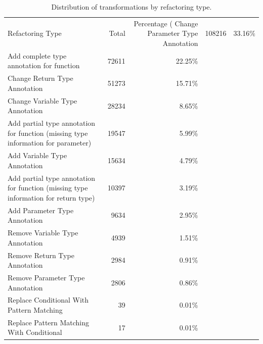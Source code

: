 \begin{table}
\caption{Distribution of transformations by refactoring type.}
\label{tab:refactoring-type-distribution}
\begin{tabular}{lrr}
\toprule
Refactoring Type & Total & Percentage (%
\midrule
Change Parameter Type Annotation & \num{108216} & 33.16\% \\
Add complete type annotation for function & \num{72611} & 22.25\% \\
Change Return Type Annotation & \num{51273} & 15.71\% \\
Change Variable Type Annotation & \num{28234} & 8.65\% \\
Add partial type annotation for function (missing type information for parameter) & \num{19547} & 5.99\% \\
Add Variable Type Annotation & \num{15634} & 4.79\% \\
Add partial type annotation for function (missing type information for return type) & \num{10397} & 3.19\% \\
Add Parameter Type Annotation & \num{9634} & 2.95\% \\
Remove Variable Type Annotation & \num{4939} & 1.51\% \\
Remove Return Type Annotation & \num{2984} & 0.91\% \\
Remove Parameter Type Annotation & \num{2806} & 0.86\% \\
Replace Conditional With Pattern Matching & \num{39} & 0.01\% \\
Replace Pattern Matching With Conditional & \num{17} & 0.01\% \\
\bottomrule
\end{tabular}
\end{table}
